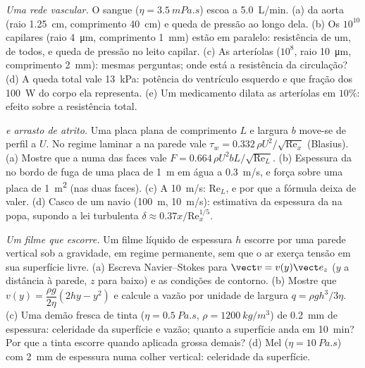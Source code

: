 \begin{exercise}[$\star\star\star$]\label{exo:b2:viscous-flows:10}
\emph{Uma rede vascular.} O sangue ($\eta = \qty{3.5}{mPa.s}$) escoa a
\qty{5.0}{L/min}. (a)  da aorta (raio \qty{1.25}{cm},
comprimento \qty{40}{cm}) e queda de pressão ao longo dela. (b) Os $10^{10}$
capilares (raio \qty{4}{\micro m}, comprimento \qty{1}{mm}) estão em paralelo:
resistência de um, de todos, e queda de pressão no leito
capilar. (c) As arteríolas ($10^8$, raio \qty{10}{\micro m}, comprimento
\qty{2}{mm}): mesmas perguntas; onde está a resistência da circulação?
(d) A queda total vale \qty{13}{kPa}: potência do ventrículo esquerdo
e que fração dos \qty{100}{W} do corpo ela representa. (e) Um medicamento dilata as
arteríolas em $10\%$: efeito sobre a resistência total.
\end{exercise}

\begin{exercise}[$\star\star\star$]\label{exo:b2:viscous-flows:11}
\emph{ e arrasto de atrito.} Uma placa plana de comprimento $L$ e
largura $b$ move-se de perfil a $U$. No regime laminar a 
na parede vale $\tau_w = 0.332\,\rho U^2/\sqrt{\mathrm{Re}_x}$ (Blasius). (a) Mostre que
a  numa das faces vale $F = 0.664\,\rho U^2bL/\sqrt{\mathrm{Re}_L}$.
(b) Espessura da  no bordo de fuga de uma placa de \qty{1}{m}
em água a \qty{0.3}{m/s}, e força sobre uma placa de \qty{1}{m^2} (nas duas
faces). (c) A \qty{10}{m/s}: $\mathrm{Re}_L$, e por que a fórmula deixa de
valer. (d) Casco de um navio (\qty{100}{m}, \qty{10}{m/s}): estimativa da espessura
da  na popa, supondo a lei turbulenta $\delta \approx
0.37x/\mathrm{Re}_x^{1/5}$.
\end{exercise}

\begin{exercise}[$\star\star\star$]\label{exo:b2:viscous-flows:12}
\emph{Um filme que escorre.} Um filme líquido de espessura $h$ escorre por uma
parede vertical sob a gravidade, em regime permanente, sem que o ar exerça tensão em
sua superfície livre. (a) Escreva Navier--Stokes para $\vect v = v(y)\vect e_z$ ($y$
a distância à parede, $z$ para baixo) e as condições de contorno.
(b) Mostre que $v(y) = \dfrac{\rho g}{2\eta}(2hy - y^2)$ e calcule a vazão
por unidade de largura $q = \rho gh^3/3\eta$. (c) Uma demão fresca de tinta ($\eta =
\qty{0.5}{Pa.s}$, $\rho = \qty{1200}{kg/m^3}$) de \qty{0.2}{mm} de espessura: celeridade
da superfície e vazão; quanto a superfície anda em \qty{10}{min}? Por que
a tinta escorre quando aplicada grossa demais? (d) Mel ($\eta = \qty{10}{Pa.s}$)
com \qty{2}{mm} de espessura numa colher vertical: celeridade da superfície.
\end{exercise}

